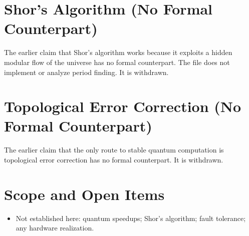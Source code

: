\documentclass[11pt, a4paper]{article}
\begin{document}
\section{Shor's Algorithm (No Formal Counterpart)}
The earlier claim that Shor's algorithm works because it exploits a hidden modular flow of the universe has no formal counterpart. The file does not implement or analyze period finding. It is withdrawn.

\section{Topological Error Correction (No Formal Counterpart)}
The earlier claim that the only route to stable quantum computation is topological error correction has no formal counterpart. It is withdrawn.

\section{Scope and Open Items}
\begin{itemize}
  \item Not established here: quantum speedups; Shor's algorithm; fault tolerance; any hardware realization.
\end{itemize}
\end{document}
